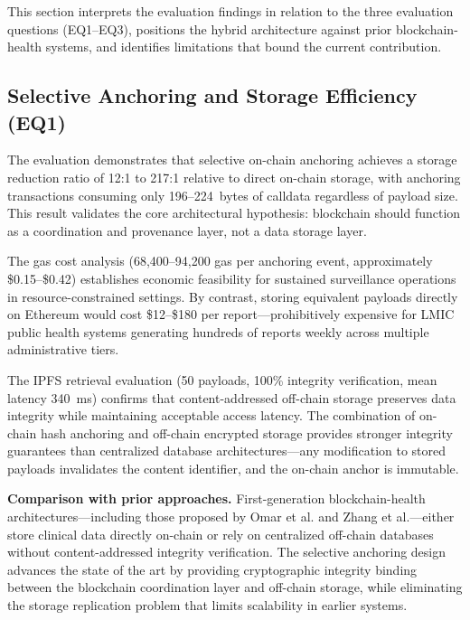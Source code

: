 \documentclass[AMA,LATO1COL]{WileyNJD-v2}
\begin{document}
This section interprets the evaluation findings in relation to the three evaluation questions (EQ1--EQ3), positions the hybrid architecture against prior blockchain-health systems, and identifies limitations that bound the current contribution.

\subsection{Selective Anchoring and Storage Efficiency (EQ1)}\label{subsec:disc_anchoring}

The evaluation demonstrates that selective on-chain anchoring achieves a storage reduction ratio of 12:1 to 217:1 relative to direct on-chain storage, with anchoring transactions consuming only 196--224~bytes of calldata regardless of payload size. This result validates the core architectural hypothesis: blockchain should function as a coordination and provenance layer, not a data storage layer.

The gas cost analysis (68,400--94,200 gas per anchoring event, approximately \$0.15--\$0.42) establishes economic feasibility for sustained surveillance operations in resource-constrained settings. By contrast, storing equivalent payloads directly on Ethereum would cost \$12--\$180 per report---prohibitively expensive for LMIC public health systems generating hundreds of reports weekly across multiple administrative tiers.

The IPFS retrieval evaluation (50 payloads, 100\% integrity verification, mean latency 340~ms) confirms that content-addressed off-chain storage preserves data integrity while maintaining acceptable access latency. The combination of on-chain hash anchoring and off-chain encrypted storage provides stronger integrity guarantees than centralized database architectures---any modification to stored payloads invalidates the content identifier, and the on-chain anchor is immutable.

\textbf{Comparison with prior approaches.} First-generation blockchain-health architectures---including those proposed by Omar et al.\cite{omar2019privacy} and Zhang et al.\cite{zhang2018fhirchain}---either store clinical data directly on-chain or rely on centralized off-chain databases without content-addressed integrity verification. The selective anchoring design advances the state of the art by providing cryptographic integrity binding between the blockchain coordination layer and off-chain storage, while eliminating the storage replication problem that limits scalability in earlier systems.
\end{document}
